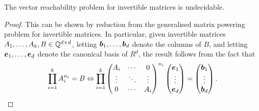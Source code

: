 \begin{theorem}
The vector reachability problem for invertible matrices is undecidable.
\end{theorem}

\begin{proof}
This can be shown by reduction from the generalised matrix powering problem for invertible matrices. In particular, given invertible matrices $A_{1}, \ldots, A_{k}, B \in \mathbb{Q}^{d \times d}$, letting $\boldsymbol{b}_{1}, \ldots, \boldsymbol{b}_{d}$ denote the columns of $B$, and letting $\boldsymbol{e}_{1}, \ldots, \boldsymbol{e}_{d}$ denote the canonical basis of $R^{d}$, the result follows from the fact that
    \begin{equation*}
        \prod\limits_{i=1}^{k} A_{i}^{n_{i}} = B \Leftrightarrow
        \prod\limits_{i=1}^{k}
        \begin{pmatrix}
            A_{i} & \cdots & 0 \\
            \vdots& \ddots & \vdots \\
            0 & \cdots & A_{i}
        \end{pmatrix}^{n_{i}}
        \begin{pmatrix}
            \boldsymbol{e}_{1} \\
            \vdots \\
            \boldsymbol{e}_{d}
        \end{pmatrix} =
        \begin{pmatrix}
            \boldsymbol{b}_{1} \\
            \vdots \\
            \boldsymbol{b}_{d}
        \end{pmatrix}.
    \end{equation*}
\end{proof}
